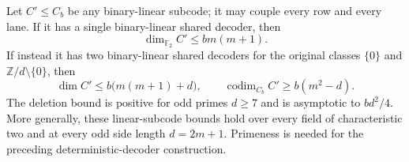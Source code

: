 \begin{theorem}\label{thm:reflection-linear-barrier}
Let $C'\le C_b$ be any binary-linear subcode; it may couple every row and
every lane. If it has a single binary-linear shared decoder, then
\[
 \dim_{\mathbb F_2}C'\le b m(m+1).
\]
If instead it has two binary-linear shared decoders for the original
classes $\{0\}$ and $\mathbb Z/d\setminus\{0\}$, then
\begin{equation}\label{eq:reflection-two-class}
 \dim C'\le b\bigl(m(m+1)+d\bigr),\qquad
 \operatorname{codim}_{C_b}C'\ge b(m^2-d).
\end{equation}
The deletion bound is positive for odd primes $d\ge7$ and is asymptotic
to $bd^2/4$.
More generally, these linear-subcode bounds hold over every field of
characteristic two and at every odd side length $d=2m+1$. Primeness is
needed for the preceding deterministic-decoder construction.
\end{theorem}

